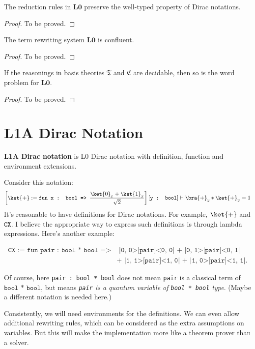 \begin{lemma}
  The reduction rules in $\textbf{L0}$ preserve the well-typed property of Dirac notations.
\end{lemma}
\begin{proof}
  To be proved.
\end{proof}

\begin{theorem}
  The term rewriting system $\textbf{L0}$ is confluent.
\end{theorem}
\begin{proof}
  To be proved.
\end{proof}

\begin{theorem}
  If the reasonings in basis theories $\mathfrak{T}$ and $\mathfrak{C}$ are decidable, then so is the word problem for $\textbf{L0}$.
\end{theorem}
\begin{proof}
  To be proved.
\end{proof}


\section{L1A Dirac Notation}
\textbf{L1A Dirac notation} is L0 Dirac notation with definition, function and environment extensions.

Consider this notation:
$$
\left [\ket{+} := \texttt{fun x : bool => }\frac{\ket{0}_x + \ket{1}_x}{\sqrt{2}} \right ][\texttt{y : bool}] \vdash \bra{+}_y * \ket{+}_y = 1
$$
It's reasonable to have definitions for Dirac notations. For example, $\ket{+}$ and $\texttt{CX}$. I believe the appropriate way to express such definitions is through lambda expressions. Here's another example:

\begin{align*}
\texttt{CX := fun pair : bool * bool =>} & \texttt{ |0, 0>[pair]<0, 0| + |0, 1>[pair]<0, 1|}\\
& \texttt{+ |1, 1>[pair]<1, 0| + |1, 0>[pair]<1, 1|.}
\end{align*}

Of course, here \texttt{pair : bool * bool} does not mean \texttt{pair} is a classical term of $\texttt{bool * bool}$, but means \textit{\texttt{pair} is a quantum variable of \texttt{bool * bool} type}. (Maybe a different notation is needed here.)

Consistently, we will need environments for the definitions. We can even allow additional rewriting rules, which can be considered as the extra assumptions on variables. But this will make the implementation more like a theorem prover than a solver.


